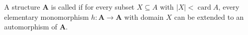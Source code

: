 A structure $\mathbf{A}$ is called  if for every subset $X \subseteq A$ with $|X| < \operatorname{card} A$, every elementary monomorphism $h : \mathbf{A} \rightarrow \mathbf{A}$ with domain $X$ can be extended to an automorphism of $\mathbf{A}$.
